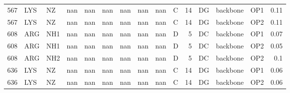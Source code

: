 \begin{longtable}{rlllrlllrlrlllr}
       567 & LYS        & NZ     & nan       &         nan & nan          & nan         & nan      &        nan    & C         &          14 & DG           & backbone    & OP1      &          0.11 \\
       567 & LYS        & NZ     & nan       &         nan & nan          & nan         & nan      &        nan    & C         &          14 & DG           & backbone    & OP2      &          0.11 \\
       608 & ARG        & NH1    & nan       &         nan & nan          & nan         & nan      &        nan    & D         &           5 & DC           & backbone    & OP1      &          0.07 \\
       608 & ARG        & NH1    & nan       &         nan & nan          & nan         & nan      &        nan    & D         &           5 & DC           & backbone    & OP2      &          0.05 \\
       608 & ARG        & NH2    & nan       &         nan & nan          & nan         & nan      &        nan    & D         &           5 & DC           & backbone    & OP2      &          0.1  \\
       636 & LYS        & NZ     & nan       &         nan & nan          & nan         & nan      &        nan    & C         &          14 & DG           & backbone    & OP1      &          0.06 \\
       636 & LYS        & NZ     & nan       &         nan & nan          & nan         & nan      &        nan    & C         &          14 & DG           & backbone    & OP2      &          0.06 \\
\hline
\end{longtable}